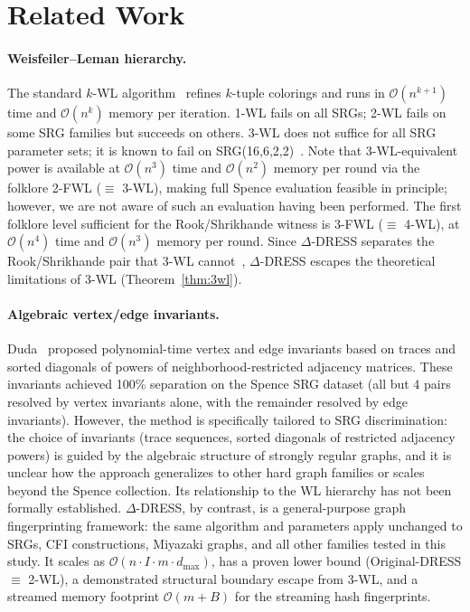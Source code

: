 \documentclass[11pt,a4paper]{article}
\begin{document}
\section{Related Work}

\paragraph{Weisfeiler--Leman hierarchy.}
The standard $k$-WL algorithm~\cite{weisfeiler1968reduction, cai1992optimal} refines $k$-tuple colorings and runs in $\mathcal{O}(n^{k+1})$ time and $\mathcal{O}(n^k)$ memory per iteration.
1-WL fails on all SRGs; 2-WL fails on some SRG families but succeeds on others.
3-WL does not suffice for all SRG parameter sets; it is known to fail on SRG(16,6,2,2)~\cite{cai1992optimal}.
Note that 3-WL-equivalent power is available at $\mathcal{O}(n^3)$ time and $\mathcal{O}(n^2)$ memory per round via the folklore 2-FWL ($\equiv$ 3-WL), making full Spence evaluation feasible in principle; however, we are not aware of such an evaluation having been performed.  The first folklore level sufficient for the Rook/Shrikhande witness is 3-FWL ($\equiv$ 4-WL), at $\mathcal{O}(n^4)$ time and $\mathcal{O}(n^3)$ memory per round.
Since $\Delta$-DRESS separates the Rook/Shrikhande pair that 3-WL cannot~\cite{castrillo2026dress}, $\Delta$-DRESS escapes the theoretical limitations of 3-WL (Theorem~\ref{thm:3wl}).

\paragraph{Algebraic vertex/edge invariants.}
Duda~\cite{duda2024simple} proposed polynomial-time vertex and edge invariants based on traces and sorted diagonals of powers of neighborhood-restricted adjacency matrices.
These invariants achieved 100\% separation on the Spence SRG dataset (all but 4 pairs resolved by vertex invariants alone, with the remainder resolved by edge invariants).
However, the method is specifically tailored to SRG discrimination: the choice of invariants (trace sequences, sorted diagonals of restricted adjacency powers) is guided by the algebraic structure of strongly regular graphs, and it is unclear how the approach generalizes to other hard graph families or scales beyond the Spence collection.
Its relationship to the WL hierarchy has not been formally established.
$\Delta$-DRESS, by contrast, is a general-purpose graph fingerprinting framework: the same algorithm and parameters apply unchanged to SRGs, CFI constructions, Miyazaki graphs, and all other families tested in this study.  It scales as $\mathcal{O}(n \cdot I \cdot m \cdot d_{\max})$, has a proven lower bound (Original-DRESS $\equiv$ 2-WL), a demonstrated structural boundary escape from 3-WL, and a streamed memory footprint $\mathcal{O}(m + B)$ for the streaming hash fingerprints.
\end{document}
